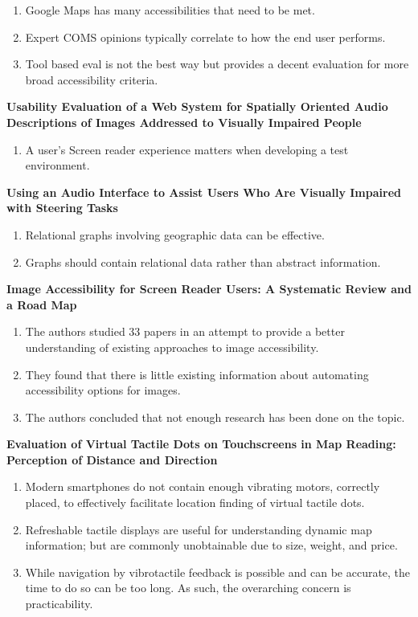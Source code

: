 \documentclass{article}
\begin{document}
\begin{enumerate}
    \item Google Maps has many accessibilities that need to be met. 
    \item Expert COMS opinions typically correlate to how the end user performs. 
    \item Tool based eval is not the best way but provides a decent evaluation for more broad accessibility criteria. 
\end{enumerate}
\cite{10.1007/978-3-319-07440-5_15} \textbf{Usability Evaluation of a Web System for Spatially Oriented Audio Descriptions of Images Addressed to Visually Impaired People } 

\begin{enumerate}
    \item A user's Screen reader experience matters when developing a test environment.
\end{enumerate}

\cite{10.1145/1168987.1169008} \textbf{Using an Audio Interface to Assist Users Who Are Visually Impaired with Steering Tasks }

\begin{enumerate}
    \item Relational graphs involving geographic data can be effective. 
    \item Graphs should contain relational data rather than abstract information. 
\end{enumerate}

\cite{electronics10080953}\textbf{Image Accessibility for Screen Reader Users: A Systematic Review and a Road Map }

\begin{enumerate}
    \item The authors studied 33 papers in an attempt to provide a better understanding of existing approaches to image accessibility.
    \item They found that there is little existing information about automating accessibility options for images.
    \item The authors concluded that not enough research has been done on the topic.
\end{enumerate}

\cite{watanabe2017evaluation}\textbf{Evaluation of Virtual Tactile Dots on Touchscreens in Map Reading: Perception of Distance and Direction }

\begin{enumerate}
    \item Modern smartphones do not contain enough vibrating motors, correctly placed, to effectively facilitate location finding of virtual tactile dots. 

    \item Refreshable tactile displays are useful for understanding dynamic map information; but are commonly unobtainable due to size, weight, and price. 

    \item While navigation by vibrotactile feedback is possible and can be accurate, the time to do so can be too long. As such, the overarching concern is practicability. 

\end{enumerate}
\end{document}
